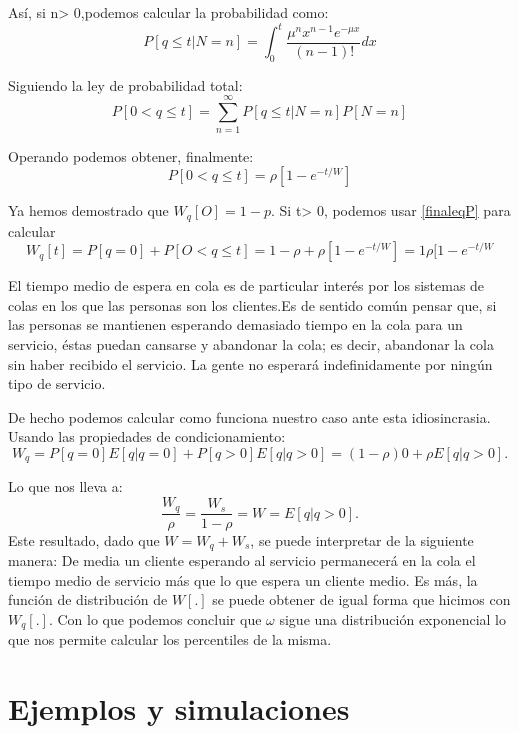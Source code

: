 \documentclass[a4paper,10pt]{scrartcl}
\theoremstyle{definition}
\numberwithin{equation}{section}
\begin{document}
Así, si n> 0,podemos calcular la probabilidad como:
\begin{equation*}
  P[q\leq t|N=n]=\int_{0}^{t}\frac{\mu^nx^{n-1}e^{-\mu x}}{(n-1)!}dx
\end{equation*}

Siguiendo la ley de probabilidad total:
\begin{equation*}
  P[0<q\leq t]=\sum_{n=1}^{\infty}P[q\leq t|N=n]P[N=n]
\end{equation*}

Operando podemos obtener, finalmente:
\begin{equation*}
  P[0<q\leq t]=\rho[1-e^{-t/W}]
\label{finaleqP}
\end{equation*}


Ya hemos demostrado que $W_q [O] = 1 - p$. Si t> 0, podemos usar \ref{finaleqP} para calcular 
\[W_q [t]=P [q = 0] + P [O <q \leq t]= 1 - \rho + \rho [1 - e^{- t / W}]=1\rho[1-e^{-t/W}\]

El tiempo medio de espera en cola es de particular interés por los sistemas de colas en los que las personas son los clientes.Es de sentido común pensar que, si las personas se mantienen esperando demasiado tiempo en la cola para un servicio, éstas puedan cansarse y abandonar la cola; es decir, abandonar la cola sin haber recibido el servicio. La gente no esperará indefinidamente por ningún tipo de servicio.

De hecho podemos calcular como funciona nuestro caso ante esta idiosincrasia. Usando las propiedades de condicionamiento:
\begin{equation*}
  W_q = P [q = 0] E [q|q = 0] + P [q> 0]E [q|q> 0] = (1 - \rho)  0 + \rho E [q|q> 0].
\end{equation*}

Lo que nos lleva a:
\begin{equation*}
\frac{W_q}{\rho}=\frac{W_s}{1-\rho}=W= E [q|q> 0].
\end{equation*}
Este resultado, dado que $W=W_q+W_s$, se puede interpretar de la siguiente manera: De media un cliente esperando al servicio permanecerá en la cola el tiempo medio de servicio más que lo que espera un cliente medio.
Es más, la función de distribución de $W[.]$ se puede obtener de igual forma que hicimos con $W_q[.]$. Con lo que podemos concluir que $\omega$ sigue una distribución exponencial lo que nos permite calcular los percentiles de la misma.

\section{Ejemplos y simulaciones}
\end{document}
